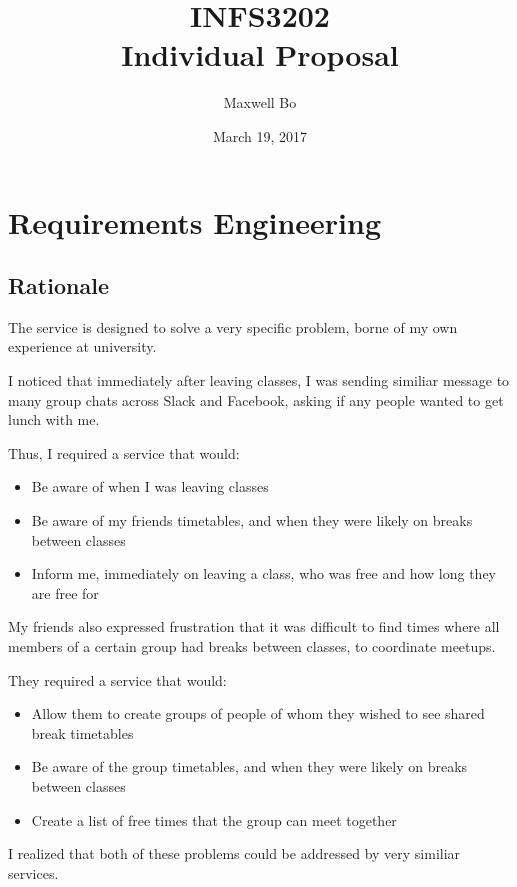 \documentclass[8pt,a4paper]{report}
\begin{document}
\title{INFS3202 \\ Individual Proposal}
\author{Maxwell Bo}
\date{March 19, 2017}
\maketitle

\chapter{Requirements Engineering}

\section{Rationale}


The service is designed to solve a very specific problem, borne of my own experience at university.

I noticed that immediately after leaving classes, I was sending similiar message to many group chats across Slack and Facebook, asking if any people wanted to get lunch with me.

Thus, I required a service that would:

\begin{itemize}
    \item Be aware of when I was leaving classes
    \item Be aware of my friends timetables, and when they were likely on breaks between classes
    \item Inform me, immediately on leaving a class, who was free and how long they are free for
\end{itemize}

My friends also expressed frustration that it was difficult to find times where all members of a certain group had breaks between classes, to coordinate meetups.

They required a service that would:

\begin{itemize}
    \item Allow them to create groups of people of whom they wished to see shared break timetables
    \item Be aware of the group timetables, and when they were likely on breaks between classes
    \item Create a list of free times that the group can meet together
\end{itemize}

I realized that both of these problems could be addressed by very similiar services. 
\end{document}
